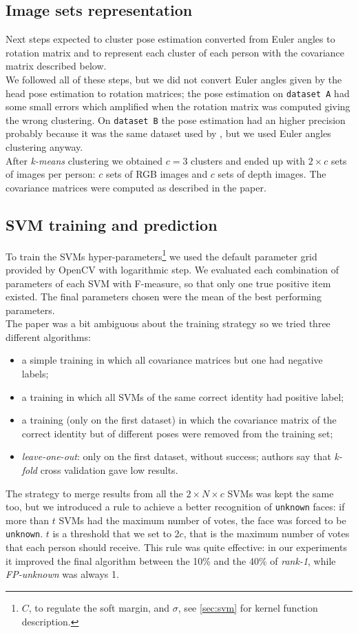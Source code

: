 \documentclass{article}
\begin{document}
\subsection{Image sets representation} \label{sec:covariances}
Next steps expected to cluster pose estimation converted from Euler angles to rotation matrix and to represent each cluster of each person with the covariance matrix described below. \\
We followed all of these steps, but we did not convert Euler angles given by the head pose estimation to rotation matrices; the pose estimation on \verb|dataset A| had some small errors which amplified when the rotation matrix was computed giving the wrong clustering. On \verb|dataset B| the pose estimation had an higher precision probably because it was the same dataset used by \citet{Fanelli2011}, but we used Euler angles clustering anyway.\\
After \textit{k-means} clustering we obtained $c=3$ clusters and ended up with $2\times c$ sets of images per person: $c$ sets of RGB images and $c$ sets of depth images. The covariance matrices were computed as described in the paper.

\subsection{SVM training and prediction} \label{sec:training}
To train the SVMs hyper-parameters\footnote{$C$, to regulate the soft margin, and $\sigma$, see \ref{sec:svm} for kernel function description.} we used the default parameter grid provided by OpenCV with logarithmic step. We evaluated each combination of parameters of each SVM with F-measure, so that only one true positive item existed. The final parameters chosen were the mean of the best performing parameters. \\
The paper was a bit ambiguous about the training strategy so we tried three different algorithms:
\begin{itemize}
	\item a simple training in which all covariance matrices but one had negative labels;
	\item a training in which all SVMs of the same correct identity had positive label;
	\item a training (only on the first dataset) in which the covariance matrix of the correct identity but of different poses were removed from the training set;
	\item \textit{leave-one-out}: only on the first dataset, without success; authors say that \textit{k-fold} cross validation gave low results.
\end{itemize}
The strategy to merge results from all the $2 \times N \times c$ SVMs was kept the same too, but we introduced a rule to achieve a better recognition of \verb|unknown| faces: if more than $t$ SVMs had the maximum number of votes, the face was forced to be \verb|unknown|. $t$ is a threshold that we set to $2c$, that is the maximum number of votes that each person should receive. This rule was quite effective: in our experiments it improved the final algorithm between the 10\% and the 40\% of \textit{rank-1}, while \textit{FP-unknown} was always 1. \\
\end{document}
